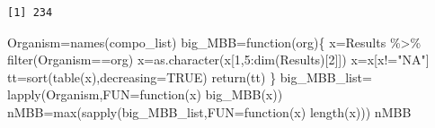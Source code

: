 \documentclass[
  letterpaper,
  DIV=11,
  numbers=noendperiod]{scrreprt}
\newenvironment{Shaded}{\begin{snugshade}}{\end{snugshade}}
\newcommand{\AttributeTok}[1]{\textcolor[rgb]{0.40,0.45,0.13}{#1}}
\newcommand{\ConstantTok}[1]{\textcolor[rgb]{0.56,0.35,0.01}{#1}}
\newcommand{\ControlFlowTok}[1]{\textcolor[rgb]{0.00,0.23,0.31}{#1}}
\newcommand{\DecValTok}[1]{\textcolor[rgb]{0.68,0.00,0.00}{#1}}
\newcommand{\FunctionTok}[1]{\textcolor[rgb]{0.28,0.35,0.67}{#1}}
\newcommand{\NormalTok}[1]{\textcolor[rgb]{0.00,0.23,0.31}{#1}}
\newcommand{\OtherTok}[1]{\textcolor[rgb]{0.00,0.23,0.31}{#1}}
\newcommand{\SpecialCharTok}[1]{\textcolor[rgb]{0.37,0.37,0.37}{#1}}
\newcommand{\StringTok}[1]{\textcolor[rgb]{0.13,0.47,0.30}{#1}}
\begin{document}
\begin{verbatim}
[1] 234
\end{verbatim}

\begin{Shaded}
\end{Shaded}

\begin{Shaded}
\begin{Highlighting}[]
\NormalTok{Organism}\OtherTok{=}\FunctionTok{names}\NormalTok{(compo\_list)}
\NormalTok{big\_MBB}\OtherTok{=}\ControlFlowTok{function}\NormalTok{(org)\{}
\NormalTok{  x}\OtherTok{=}\NormalTok{Results }\SpecialCharTok{\%\textgreater{}\%} \FunctionTok{filter}\NormalTok{(Organism}\SpecialCharTok{==}\NormalTok{org)}
\NormalTok{  x}\OtherTok{=}\FunctionTok{as.character}\NormalTok{(x[}\DecValTok{1}\NormalTok{,}\DecValTok{5}\SpecialCharTok{:}\FunctionTok{dim}\NormalTok{(Results)[}\DecValTok{2}\NormalTok{]])}
\NormalTok{  x}\OtherTok{=}\NormalTok{x[x}\SpecialCharTok{!=}\StringTok{"NA"}\NormalTok{]}
\NormalTok{  tt}\OtherTok{=}\FunctionTok{sort}\NormalTok{(}\FunctionTok{table}\NormalTok{(x),}\AttributeTok{decreasing=}\ConstantTok{TRUE}\NormalTok{)}
  \FunctionTok{return}\NormalTok{(tt)}
\NormalTok{  \}}
\NormalTok{big\_MBB\_list}\OtherTok{=} \FunctionTok{lapply}\NormalTok{(Organism,}\AttributeTok{FUN=}\ControlFlowTok{function}\NormalTok{(x) }\FunctionTok{big\_MBB}\NormalTok{(x))}
\NormalTok{nMBB}\OtherTok{=}\FunctionTok{max}\NormalTok{(}\FunctionTok{sapply}\NormalTok{(big\_MBB\_list,}\AttributeTok{FUN=}\ControlFlowTok{function}\NormalTok{(x) }\FunctionTok{length}\NormalTok{(x)))}
\NormalTok{nMBB}
\end{Highlighting}
\end{Shaded}
\end{document}
